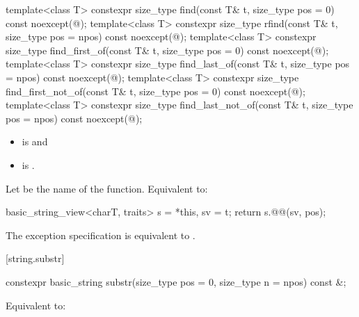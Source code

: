 %
%
%
%
%
%
\begin{itemdecl}
template<class T>
  constexpr size_type find(const T& t, size_type pos = 0) const noexcept(@\seebelow@);
template<class T>
  constexpr size_type rfind(const T& t, size_type pos = npos) const noexcept(@\seebelow@);
template<class T>
  constexpr size_type find_first_of(const T& t, size_type pos = 0) const noexcept(@\seebelow@);
template<class T>
  constexpr size_type find_last_of(const T& t, size_type pos = npos) const noexcept(@\seebelow@);
template<class T>
  constexpr size_type find_first_not_of(const T& t, size_type pos = 0) const noexcept(@\seebelow@);
template<class T>
  constexpr size_type find_last_not_of(const T& t, size_type pos = npos) const noexcept(@\seebelow@);
\end{itemdecl}

\begin{itemdescr}
\pnum
\constraints
\begin{itemize}
\item
{} is
 and
\item
{} is
.
\end{itemize}

\pnum
\effects
Let  be the name of the function.
Equivalent to:
\begin{codeblock}
basic_string_view<charT, traits> s = *this, sv = t;
return s.@@(sv, pos);
\end{codeblock}

\pnum
\remarks
The exception specification is equivalent to
.
\end{itemdescr}

[string.substr]{}

%
\begin{itemdecl}
constexpr basic_string substr(size_type pos = 0, size_type n = npos) const &;
\end{itemdecl}

\begin{itemdescr}
\pnum
\effects
Equivalent to: 
\end{itemdescr}

